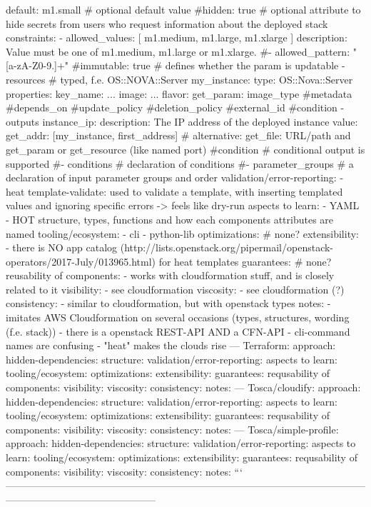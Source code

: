           default: m1.small # optional default value
          #hidden: true # optional attribute to hide secrets from users who request information about the deployed stack
          constraints:
            - allowed_values: [ m1.medium, m1.large, m1.xlarge ]
              description: Value must be one of m1.medium, m1.large or m1.xlarge.
            #- allowed_pattern: "[a-zA-Z0-9.]+"
          #immutable: true # defines whether the param is updatable
    - resources # typed, f.e. OS::NOVA::Server
        my_instance:
          type: OS::Nova::Server
          properties:
            key_name: ...
            image: ...
            flavor: { get_param: image_type }
          #metadata
          #depends_on
          #update_policy
          #deletion_policy
          #external_id
          #condition
    - outputs
        instance_ip:
          description: The IP address of the deployed instance
          value: { get_addr: [my_instance, first_address] } # alternative: get_file: URL/path and get_param or get_resource (like named port)
          #condition # conditional output is supported
    #- conditions # declaration of conditions
    #- parameter_groups # a declaration of input parameter groups and order
  validation/error-reporting:
    - heat template-validate: used to validate a template, with inserting templated values and ignoring specific errors -> feels like dry-run
  aspects to learn:
    - YAML
    - HOT structure, types, functions and how each components attributes are named
  tooling/ecosystem:
    - cli
    - python-lib
  optimizations: # none?
  extensibility:
    - there is NO app catalog (http://lists.openstack.org/pipermail/openstack-operators/2017-July/013965.html) for heat templates
  guarantees: # none?
  reusability of components:
    - works with cloudformation stuff, and is closely related to it
  visibility:
    - see cloudformation
  viscosity:
    - see cloudformation (?)
  consistency:
    - similar to cloudformation, but with openstack types
  notes:
    - imitates AWS Cloudformation on several occasions (types, structures, wording (f.e. stack))
    - there is a openstack REST-API AND a CFN-API
    - cli-command names are confusing
    - "heat" makes the clouds rise
---
Terraform:
  approach:
  hidden-dependencies:
  structure:
  validation/error-reporting:
  aspects to learn:
  tooling/ecosystem:
  optimizations:
  extensibility:
  guarantees:
  requsability of components:
  visibility:
  viscosity:
  consistency:
  notes:
---
Tosca/cloudify:
  approach:
  hidden-dependencies:
  structure:
  validation/error-reporting:
  aspects to learn:
  tooling/ecosystem:
  optimizations:
  extensibility:
  guarantees:
  requsability of components:
  visibility:
  viscosity:
  consistency:
  notes:
---
Tosca/simple-profile:
  approach:
  hidden-dependencies:
  structure:
  validation/error-reporting:
  aspects to learn:
  tooling/ecosystem:
  optimizations:
  extensibility:
  guarantees:
  requsability of components:
  visibility:
  viscosity:
  consistency:
  notes:
```
---------------------------------------------------------------------------------------------------------------------------------------------------------

